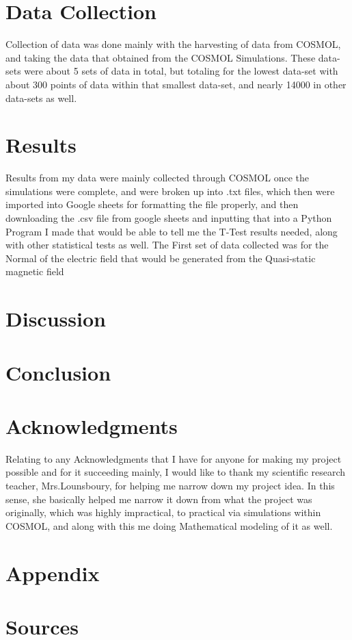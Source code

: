 \documentclass[]{article}
\begin{document}
\section{Data Collection}
Collection of data was done mainly with the harvesting of data from COSMOL, and taking the data that obtained from the COSMOL Simulations. These data-sets were about 5 sets of data in total, but totaling for the lowest data-set with about 300 points of data within that smallest data-set, and nearly 14000 in other data-sets as well.

\section{Results}
Results from my data were mainly collected through COSMOL once the simulations were complete, and were broken up into .txt files, which then were imported into Google sheets for formatting the file properly, and then downloading the .csv file from google sheets and inputting that into a Python Program I made that would be able to tell me the T-Test results needed, along with other statistical tests as well. The First set of data collected was for the Normal of the electric field that would be generated from the Quasi-static magnetic field
\section{Discussion}

\section{Conclusion}

\section{Acknowledgments}
Relating to any Acknowledgments that I have for anyone for making my project possible and for it succeeding mainly, I would like to thank my scientific research teacher, Mrs.Lounsboury, for helping me narrow down my project idea. In this sense, she basically helped me narrow it down from what the project was originally, which was highly impractical, to practical via simulations within COSMOL, and along with this me doing Mathematical modeling of it as well.  
\section{Appendix}

\section{Sources}

\end{document}
